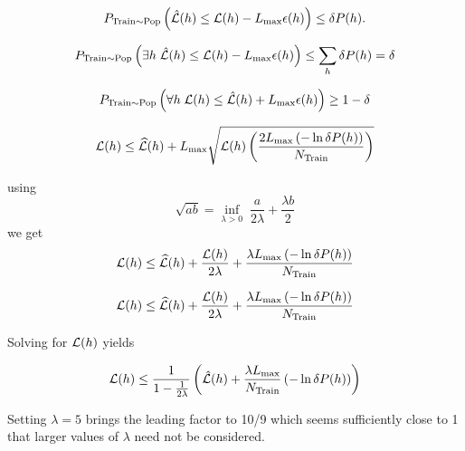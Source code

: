 {

$$P_{\mathrm{Train} \sim \mathrm{Pop}}\left(\hat{{\cal L}}(h) \leq {\cal L}(h) - L_{\max}\epsilon(h)\right) \leq \delta P(h).$$

\vfill
$$P_{\mathrm{Train} \sim \mathrm{Pop}}\left(\exists h\;\hat{{\cal L}}(h) \leq {\cal L}(h) - L_{\max}\epsilon(h)\right) \leq \sum_h \delta P(h) =\delta$$

\vfill
$$P_{\mathrm{Train} \sim \mathrm{Pop}}\left(\forall h\;{\cal L}(h) \leq \hat{{\cal L}}(h) + L_{\max}\epsilon(h)\right) \geq 1- \delta$$


$${\cal L}(h) \leq \widehat{{\cal L}}(h) + L_{\max}\sqrt{{\cal L}(h)\left(\frac{2L_{\max} \left(- \ln \delta P(h)\right)}{N_\mathrm{Train}}\right)}$$

using
$$\sqrt{ab} = \inf_{\lambda > 0}\;\frac{a}{2\lambda} + \frac{\lambda b}{2}$$
\vfill
we get
$${\cal L}(h) \leq \widehat{{\cal L}}(h) + \frac{{\cal L}(h)}{2\lambda} + \frac{\lambda L_{\max}\left(- \ln \delta P(h)\right)}{N_\mathrm{Train}}$$

$${\cal L}(h) \leq \widehat{{\cal L}}(h) + \frac{{\cal L}(h)}{2\lambda} + \frac{\lambda L_{\max}\left(-\ln \delta P(h)\right)}{N_\mathrm{Train}}$$

\vfill
Solving for ${\cal L}(h)$ yields

\vfill
$${\cal L}(h) \leq \frac{1}{1-\frac{1}{2\lambda}}\left(\hat{{\cal L}}(h) + \frac{\lambda L_{\max}}{N_\mathrm{Train}}\left(-\ln\delta P(h)\right)\right)$$

\vfill
Setting $\lambda = 5$ brings the leading factor to 10/9 which seems sufficiently close to 1 that larger values of $\lambda$ need not be considered.


}

